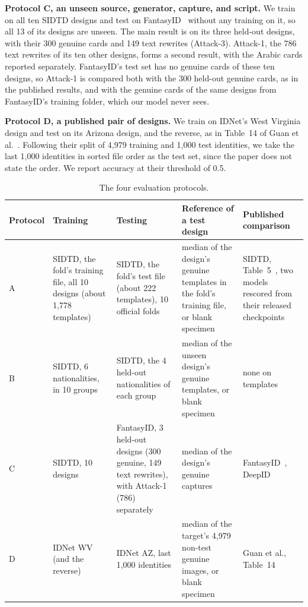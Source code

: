 \documentclass[12pt,a4paper]{article}
\newif\ifshowguidance
\newcommand{\todo}[1]{\ifshowguidance\leavevmode{\color{gray}\itshape [#1]}\fi}
\begin{document}
\textbf{Protocol C, an unseen source, generator, capture, and script.} We train on all ten SIDTD designs and test on FantasyID~\cite{korshunov2025fantasyid} without any training on it, so all 13 of its designs are unseen. The main result is on its three held-out designs, with their 300 genuine cards and 149 text rewrites (Attack-3). Attack-1, the 786 text rewrites of its ten other designs, forms a second result, with the Arabic cards reported separately. FantasyID's test set has no genuine cards of these ten designs, so Attack-1 is compared both with the 300 held-out genuine cards, as in the published results, and with the genuine cards of the same designs from FantasyID's training folder, which our model never sees. \todo{Protocols C and D are revisited in their own plan after Protocols A and B. Confirm the Protocol C training set (SIDTD only, or with IDNet AZ and WV) now that face attacks are out of scope.}

\textbf{Protocol D, a published pair of designs.} We train on IDNet's West Virginia design and test on its Arizona design, and the reverse, as in Table~14 of Guan et al.~\cite{guan2024idnetarxiv}. Following their split of 4,979 training and 1,000 test identities, we take the last 1,000 identities in sorted file order as the test set, since the paper does not state the order. We report accuracy at their threshold of 0.5. \todo{Confirm which IDNet tasks Protocol D reports now that face attacks are out of scope, and whether IDNet's text replacement copies fields between documents of the same design, which a reference cannot reveal, as with SIDTD's crop-and-replace.}

\begin{table}[htbp]
\centering\footnotesize
\setlength{\tabcolsep}{3pt}
\renewcommand{\arraystretch}{1.1}
\caption{The four evaluation protocols.}
\label{tab:protocols}
\begin{tabular}{L{0.9cm}L{3.2cm}L{3.9cm}L{3.3cm}L{3.6cm}}
\toprule
Protocol & Training & Testing & Reference of a test design & Published comparison \\
\midrule
A & SIDTD, the fold's training file, all 10 designs (about 1,778 templates) & SIDTD, the fold's test file (about 222 templates), 10 official folds & median of the design's genuine templates in the fold's training file, or blank specimen & SIDTD, Table~5~\cite{boned2024sidtd}, two models rescored from their released checkpoints \\
B & SIDTD, 6 nationalities, in 10 groups & SIDTD, the 4 held-out nationalities of each group & median of the unseen design's genuine templates, or blank specimen & none on templates \\
C & SIDTD, 10 designs & FantasyID, 3 held-out designs (300 genuine, 149 text rewrites), with Attack-1 (786) separately & median of the design's genuine captures & FantasyID~\cite{korshunov2025fantasyid}, DeepID~\cite{korshunov2025deepid} \\
D & IDNet WV (and the reverse) & IDNet AZ, last 1,000 identities & median of the target's 4,979 non-test genuine images, or blank specimen & Guan et al., Table~14~\cite{guan2024idnetarxiv} \\
\bottomrule
\end{tabular}
\end{table}
\end{document}
